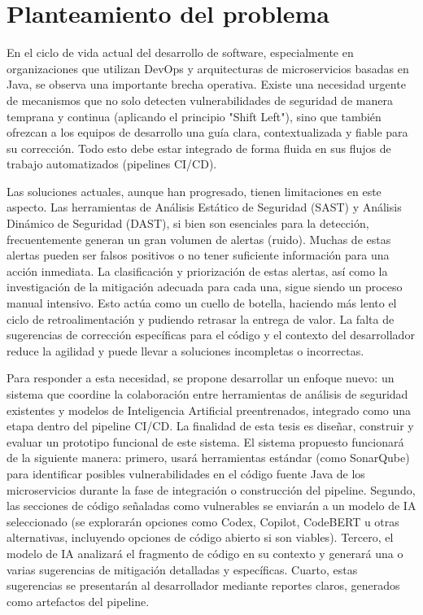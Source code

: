 \section{Planteamiento del problema}\label{sec:planteamiento_problema}
En el ciclo de vida actual del desarrollo de software, especialmente en organizaciones que utilizan DevOps y arquitecturas de microservicios basadas en Java, se observa una importante brecha operativa. Existe una necesidad urgente de mecanismos que no solo detecten vulnerabilidades de seguridad de manera temprana y continua (aplicando el principio "Shift Left"), sino que también ofrezcan a los equipos de desarrollo una guía clara, contextualizada y fiable para su corrección. Todo esto debe estar integrado de forma fluida en sus flujos de trabajo automatizados (pipelines CI/CD).

Las soluciones actuales, aunque han progresado, tienen limitaciones en este aspecto. Las herramientas de Análisis Estático de Seguridad (SAST) y Análisis Dinámico de Seguridad (DAST), si bien son esenciales para la detección, frecuentemente generan un gran volumen de alertas (ruido). Muchas de estas alertas pueden ser falsos positivos o no tener suficiente información para una acción inmediata. La clasificación y priorización de estas alertas, así como la investigación de la mitigación adecuada para cada una, sigue siendo un proceso manual intensivo. Esto actúa como un cuello de botella, haciendo más lento el ciclo de retroalimentación y pudiendo retrasar la entrega de valor. La falta de sugerencias de corrección específicas para el código y el contexto del desarrollador reduce la agilidad y puede llevar a soluciones incompletas o incorrectas.

Para responder a esta necesidad, se propone desarrollar un enfoque nuevo: un sistema que coordine la colaboración entre herramientas de análisis de seguridad existentes y modelos de Inteligencia Artificial preentrenados, integrado como una etapa dentro del pipeline CI/CD. La finalidad de esta tesis es diseñar, construir y evaluar un prototipo funcional de este sistema. El sistema propuesto funcionará de la siguiente manera: primero, usará herramientas estándar (como SonarQube) para identificar posibles vulnerabilidades en el código fuente Java de los microservicios durante la fase de integración o construcción del pipeline. Segundo, las secciones de código señaladas como vulnerables se enviarán a un modelo de IA seleccionado (se explorarán opciones como Codex, Copilot, CodeBERT u otras alternativas, incluyendo opciones de código abierto si son viables). Tercero, el modelo de IA analizará el fragmento de código en su contexto y generará una o varias sugerencias de mitigación detalladas y específicas. Cuarto, estas sugerencias se presentarán al desarrollador mediante reportes claros, generados como artefactos del pipeline.

